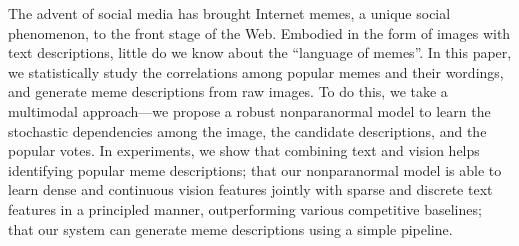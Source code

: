 The advent of social media has brought Internet memes, a unique social phenomenon, to the front stage of the Web. Embodied in the form of images with text descriptions, little do we know about the ``language of memes''. In this paper, we statistically study the correlations among popular memes and their wordings, and generate meme descriptions from raw images. To do this, we take a multimodal approach---we propose a robust nonparanormal model to learn the stochastic dependencies among the image, the candidate descriptions, and the popular votes. In experiments, we show that combining text and vision helps identifying popular meme descriptions; that our nonparanormal model is able to learn dense and continuous vision features jointly with sparse and discrete text features in a principled manner, outperforming various competitive baselines; that our system can generate meme descriptions using a simple pipeline.
